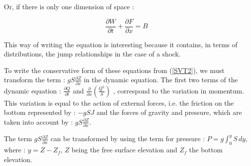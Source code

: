 \vspace{0.5cm}

Or, if there is only one dimension of space :

\begin{equation}
 \frac{\partial W}{\partial t} + \frac{\partial F}{\partial x} = B
\end{equation}

\vspace{0.5cm}

This way of writing the equation is interesting because it contains, in terms of distributions, the jump relationships in the case of a shock.

\vspace{0.5cm}

To write the conservative form of these equations from (\ref{SVT2}), we must transform the term : $g S \frac{\partial Z}{\partial x}$ in the dynamic equation. The first two terms of the dynamic equation : $\frac{\partial Q}{\partial t}$ and $\frac{\partial}{\partial x}\left ( \frac{Q^2}{S}\right )$ , correspond to the variation in momentum. This variation is equal to the action of external forces, i.e. the friction on the bottom represented by : $-g S J$ and the forces of gravity and pressure, which are taken into account by : $g S \frac{\partial Z}{\partial x}$.

\vspace{0.5cm}

The term $g S \frac{\partial Z}{\partial x}$ can be transformed by using the term for pressure : $P = g \int_{0}^{y} S \, dy$, where : $y = Z - Z_f$, $Z$ being the free surface elevation and $Z_f$ the bottom elevation.

